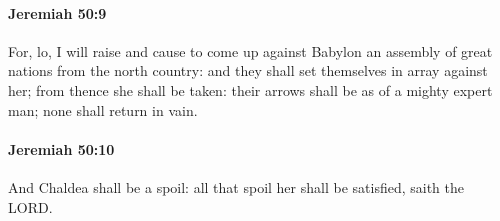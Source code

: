 		\paragraph{Jeremiah 50:9} %
			\label{JEREMIAH-50-9}

			For, lo, I will raise and cause to come up against Babylon an assembly of great nations from the north country: and they shall set themselves in array against her; from thence she shall be taken: their arrows shall be as of a mighty expert man; none shall return in vain.


		\paragraph{Jeremiah 50:10} %
			\label{JEREMIAH-50-10}

			And Chaldea shall be a spoil: all that spoil her shall be satisfied, saith the LORD.


